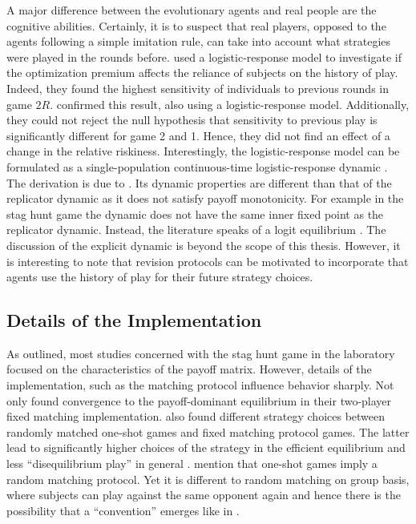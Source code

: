 A major difference between the evolutionary agents and 
real people are the cognitive abilities.
Certainly, it is to suspect that real players, opposed to the agents
following a simple imitation rule, can take into account what strategies 
were played in the rounds before.
\textcite{battalio_optimization_2001} used a logistic-response model to
investigate if the optimization premium affects the reliance of subjects
on the history of play. Indeed, they found the highest sensitivity of 
individuals to previous rounds in game $2R$.
\textcite{dubois_optimization_2012} confirmed this result, also using 
a logistic-response model. Additionally, they could not reject the null
hypothesis that sensitivity to previous play is significantly different for
game 2 and 1. Hence, they did not find an effect of a change in the
relative riskiness. Interestingly, the logistic-response model can be
formulated as a single-population continuous-time logistic-response dynamic
\parencite[752]{battalio_optimization_2001}. The derivation is due to
\textcite{fudenberg_theory_1998}. Its dynamic properties are different
than that of the replicator dynamic as it does not satisfy payoff monotonicity.
For example in the stag hunt game the dynamic does not have the same inner
fixed point as the replicator dynamic. Instead, the literature speaks
of a logit equilibrium \parencite{battalio_optimization_2001}. The discussion
of the explicit dynamic is beyond the scope of this thesis. 
However, it is interesting to note that revision protocols can be motivated 
to incorporate that agents use the history of play for their future strategy
choices.

\subsection{Details of the Implementation}
As outlined, most studies concerned with the stag hunt game in the 
laboratory focused on the characteristics of the payoff matrix. 
However, details of the implementation,
such as the matching protocol influence behavior sharply. Not only 
\textcite{van_huyck_tacit_1990} found 
convergence to the payoff-dominant equilibrium in their two-player 
fixed matching implementation.  
\textcite{clark_repetition_2001} also found different strategy 
choices between randomly matched one-shot games and fixed matching protocol 
games. The latter lead to significantly higher choices of the strategy 
in the efficient equilibrium and less ``disequilibrium play'' in general
\parencite[]{clark_repetition_2001}. 
\textcite{devetag_when_2007} mention that one-shot games imply a 
random matching protocol. Yet it is different to random matching on group
basis, where subjects can play against the same opponent again 
and hence there is the possibility that a ``convention'' emerges like in 
\textcite{rankin_strategic_2000}.

